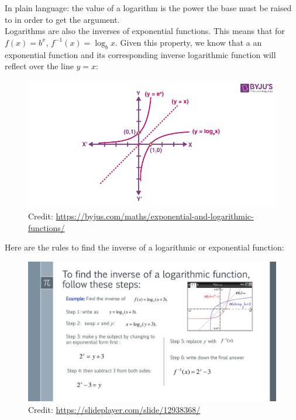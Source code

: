 \documentclass[12pt]{article}
\begin{document}
In plain language: the value of a logarithm is the power the base must be raised to in order to get the argument.\\

Logarithms are also the inverses of exponential functions. This means that for \(f(x)=b^x\), \(f^{-1}(x)=\log_bx\). Given this property, we know that a an exponential function and its corresponding inverse logarithmic function will reflect over the line \(y=x\):\\

\begin{figure}[H]
	\centering
	\includegraphics[scale=0.5]{inv.png}
	\caption{Credit: \url{https://byjus.com/maths/exponential-and-logarithmic-functions/}}
\end{figure}

Here are the rules to find the inverse of a logarithmic or exponential function:\\

\begin{figure}[H]
	\centering
	\includegraphics[scale=1.75]{loginv.jpg}
	\caption{Credit: \url{https://slideplayer.com/slide/12938368/}}
\end{figure}
\end{document}
